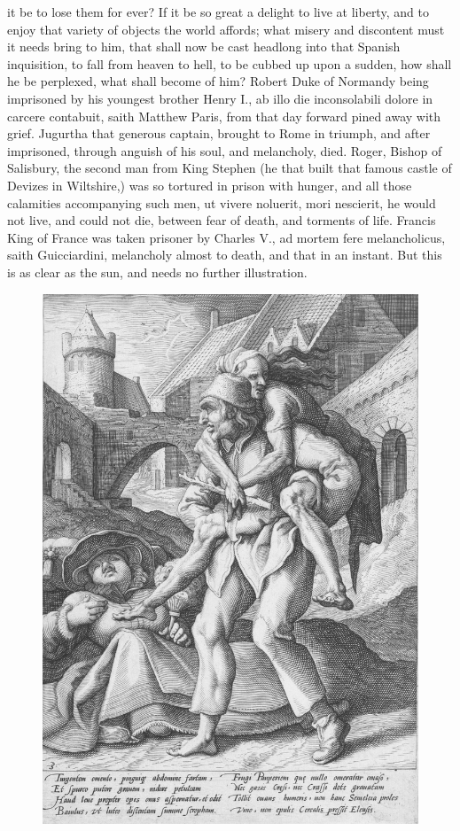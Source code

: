 {it be to lose them for ever? If it be so great a delight to live at
liberty, and to enjoy that variety of objects the world affords; what
misery and discontent must it needs bring to him, that shall now be
cast headlong into that Spanish inquisition, to fall from heaven to
hell, to be cubbed up upon a sudden, how shall he be perplexed, what
shall become of him?  Robert Duke of Normandy being imprisoned by
his youngest brother Henry I., ab illo die inconsolabili dolore in
carcere contabuit, saith Matthew Paris, from that day forward pined
away with grief. Jugurtha that generous captain, brought to Rome
in triumph, and after imprisoned, through anguish of his soul, and
melancholy, died. Roger, Bishop of Salisbury, the second man from
King Stephen (he that built that famous castle of Devizes in
Wiltshire,) was so tortured in prison with hunger, and all those
calamities accompanying such men, ut vivere noluerit, mori
nescierit, he would not live, and could not die, between fear of death,
and torments of life. Francis King of France was taken prisoner by
Charles V., ad mortem fere melancholicus, saith Guicciardini,
melancholy almost to death, and that in an instant. But this is as
clear as the sun, and needs no further illustration.

\begin{figure}[p]
  \centering
  \includegraphics[keepaspectratio,width=\textwidth]{figures/carrying-povery-small.jpg}
  \caption{}
  \label{fig:povertyriches}
\end{figure}

}
